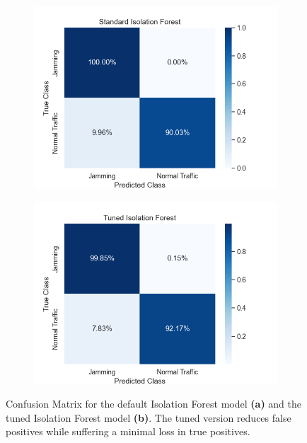 \documentclass[futureinternet,article,submit,pdftex,moreauthors]{Definitions/mdpi}
\begin{document}
\begin{figure}[H]
	\centering
	\begin{subfigure}{0.49\textwidth}
		\centering
		\includegraphics[width=\textwidth]{img/ConfusionMatrixStandardIF.png}
		\caption{}
		\label{fig:ConfusionMatrixStandardIF}
	\end{subfigure}
	\hfill
	\begin{subfigure}{0.49\textwidth}
		\centering
		\includegraphics[width=\textwidth]{img/ConfusionMatrixTunedIF.png}
		\caption{}
		\label{fig:ConfusionMatrixTunedIF}
	\end{subfigure}
	\caption{Confusion Matrix for the default Isolation Forest model \textbf{(a)} and the tuned Isolation Forest model \textbf{(b)}. The tuned version reduces false positives while suffering a minimal loss in true positives.}
	\label{fig:ConfusionMatrixStandardTunedIF}
\end{figure}
\end{document}
